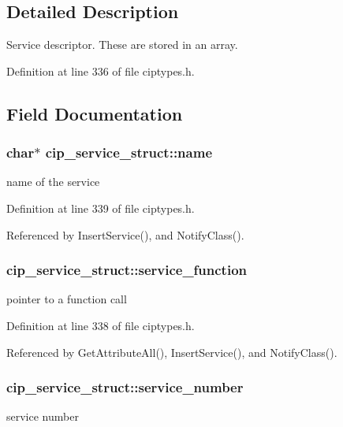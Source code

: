 \subsection{\-Detailed \-Description}
\-Service descriptor. \-These are stored in an array. 

\-Definition at line 336 of file ciptypes.\-h.



\subsection{\-Field \-Documentation}
\hypertarget{structcip__service__struct_ae5d6e5c2e95996dbc9bf1cd21688207e}{
\subsubsection[{name}]{\setlength{\rightskip}{0pt plus 5cm}char$\ast$ {\bf cip\-\_\-service\-\_\-struct\-::name}}}\label{d8/de2/structcip__service__struct_ae5d6e5c2e95996dbc9bf1cd21688207e}
name of the service 

\-Definition at line 339 of file ciptypes.\-h.



\-Referenced by \-Insert\-Service(), and \-Notify\-Class().

\hypertarget{structcip__service__struct_a5f07adeac545e07afa80e2badb94b091}{
\subsubsection[{service\-\_\-function}]{ {\bf cip\-\_\-service\-\_\-struct\-::service\-\_\-function}}}\label{d8/de2/structcip__service__struct_a5f07adeac545e07afa80e2badb94b091}
pointer to a function call 

\-Definition at line 338 of file ciptypes.\-h.



\-Referenced by \-Get\-Attribute\-All(), \-Insert\-Service(), and \-Notify\-Class().

\hypertarget{structcip__service__struct_a5dee19825bde9eba9ae121d7cd0cfbcd}{
\subsubsection[{service\-\_\-number}]{ {\bf cip\-\_\-service\-\_\-struct\-::service\-\_\-number}}}\label{d8/de2/structcip__service__struct_a5dee19825bde9eba9ae121d7cd0cfbcd}
service number 


